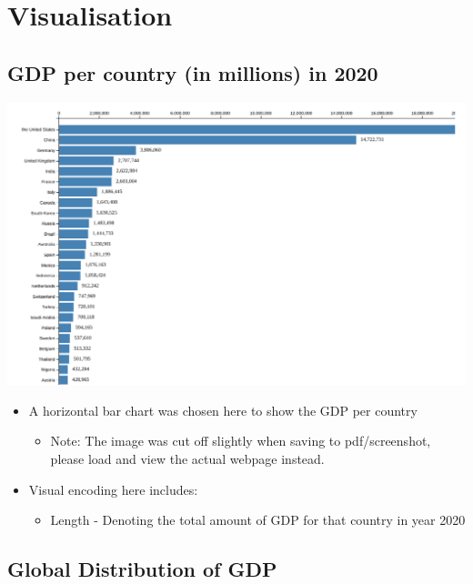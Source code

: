 \documentclass[a4paper, 11pt]{article}
\begin{document}
\section{Visualisation}
\label{sec:orgbe17a5d}
\subsection{GDP per country (in millions) in 2020}
\label{sec:org2d583a0}

\begin{center}
\includegraphics[width=.9\linewidth]{./charts/gdp_per_country.png}
\end{center}

\begin{itemize}
\item A horizontal bar chart was chosen here to show the GDP per country
\begin{itemize}
\item Note: The image was cut off slightly when saving to pdf/screenshot, please load and view the actual webpage instead.
\end{itemize}
\item Visual encoding here includes:
\begin{itemize}
\item Length - Denoting the total amount of GDP for that country in year 2020
\end{itemize}
\end{itemize}
\subsection{Global Distribution of GDP}
\label{sec:org727fb53}
\end{document}
